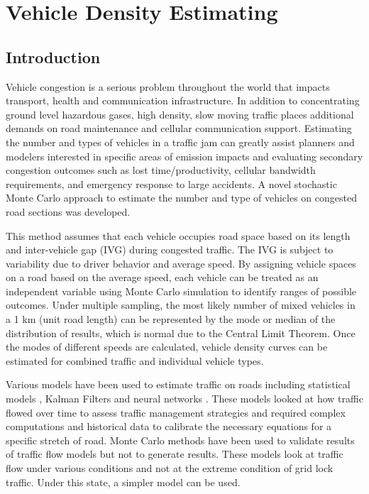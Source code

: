 \chapter{Vehicle Density Estimating}

\section{Introduction}
 
Vehicle congestion is a serious problem throughout the world that impacts transport, health and communication infrastructure.  In addition to concentrating ground level hazardous gases, high density, slow moving traffic places additional demands on road maintenance and cellular communication support.  Estimating the number and types of vehicles in a traffic jam can greatly assist planners and modelers interested in specific areas of emission impacts and evaluating secondary congestion outcomes such as lost time/productivity, cellular bandwidth requirements, and emergency response to large accidents. A novel stochastic Monte Carlo approach to estimate the number and type of vehicles on congested road sections was developed.  

This method assumes that each vehicle occupies road space based on its length and inter-vehicle gap (IVG) during congested traffic.  The IVG is subject to variability due to driver behavior and average speed.  By assigning vehicle spaces on a road based on the average speed, each vehicle can be treated as an independent variable using Monte Carlo simulation to identify ranges of possible outcomes.  Under multiple sampling, the most likely number of mixed vehicles in a 1 km (unit road length) can be represented by the mode or median of the distribution of results, which is normal due to the Central Limit Theorem.  Once the modes of different speeds are calculated, vehicle density curves can be estimated for combined traffic and individual vehicle types.

Various models have been used to estimate traffic on roads including statistical models \citep{Schreckenberg1995}, Kalman Filters \citep{Pourmoallem1997, Sun2004} and neural networks \citep{Ghosh-Dastidar2006}.  These models looked at how traffic flowed over time to assess traffic management strategies and required complex computations and historical data to calibrate the necessary equations for a specific stretch of road.  Monte Carlo methods have been used to validate results of traffic flow models \citep{Mihaylova2004} but not to generate results.  These models look at traffic flow under various conditions and not at the extreme condition of grid lock traffic.  Under this state, a simpler model can be used.

